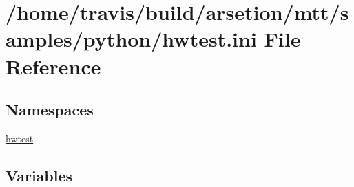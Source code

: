 \hypertarget{hwtest_8ini}{\section{/home/travis/build/arsetion/mtt/samples/python/hwtest.ini File Reference}
\label{hwtest_8ini}
}
\subsection*{Namespaces}
\begin{DoxyCompactItemize}
\item 
\hyperlink{namespacehwtest}{hwtest}
\end{DoxyCompactItemize}
\subsection*{Variables}
